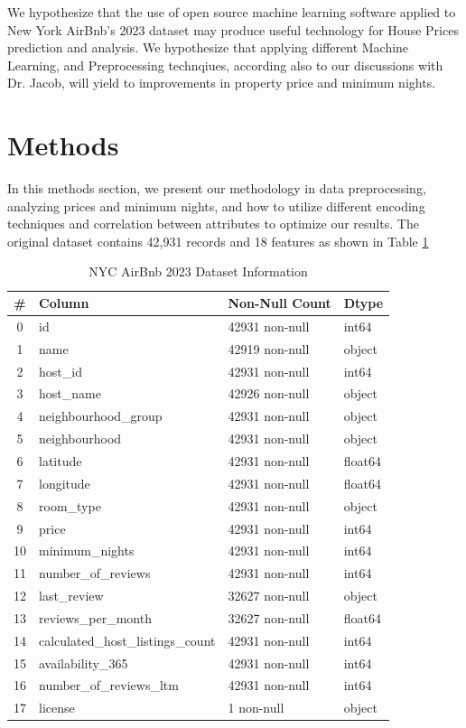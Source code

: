\documentclass[a4paper,12pt]{article}
\begin{document}
We hypothesize that the use of open source machine learning software applied to New York AirBnb's 2023 dataset may produce useful technology for House Prices prediction and analysis. We hypothesize that applying different Machine Learning, and Preprocessing technqiues, according also to our discussions with Dr. Jacob, will yield to improvements in property price and minimum nights.

\section*{Methods}

In this methods section, we present our methodology in data preprocessing,
analyzing prices and minimum nights, and how to utilize different encoding techniques and correlation between attributes to optimize our results.
The original dataset contains 42,931 records and 18 features as shown in Table \ref{tab:dataframe_overview}

\begin{table}[h!]
\centering
\begin{tabular}{|c|l|l|l|}
\hline
\textbf{\#} & \textbf{Column} & \textbf{Non-Null Count} & \textbf{Dtype} \\ \hline
0 & id & 42931 non-null & int64 \\ \hline
1 & name & 42919 non-null & object \\ \hline
2 & host\_id & 42931 non-null & int64 \\ \hline
3 & host\_name & 42926 non-null & object \\ \hline
4 & neighbourhood\_group & 42931 non-null & object \\ \hline
5 & neighbourhood & 42931 non-null & object \\ \hline
6 & latitude & 42931 non-null & float64 \\ \hline
7 & longitude & 42931 non-null & float64 \\ \hline
8 & room\_type & 42931 non-null & object \\ \hline
9 & price & 42931 non-null & int64 \\ \hline
10 & minimum\_nights & 42931 non-null & int64 \\ \hline
11 & number\_of\_reviews & 42931 non-null & int64 \\ \hline
12 & last\_review & 32627 non-null & object \\ \hline
13 & reviews\_per\_month & 32627 non-null & float64 \\ \hline
14 & calculated\_host\_listings\_count & 42931 non-null & int64 \\ \hline
15 & availability\_365 & 42931 non-null & int64 \\ \hline
16 & number\_of\_reviews\_ltm & 42931 non-null & int64 \\ \hline
17 & license & 1 non-null & object \\ \hline
\end{tabular}
\caption{NYC AirBnb 2023 Dataset Information}
\label{tab:dataframe_overview}
\end{table}
\end{document}
